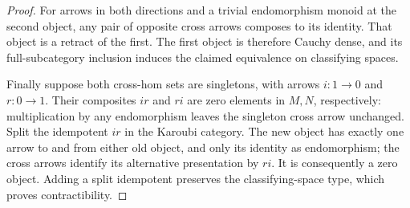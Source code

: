 \begin{proof}
For arrows in both directions and a trivial endomorphism monoid at
the second object, any pair of opposite cross arrows composes to its
identity. That object is a retract of the first. The first object is
therefore Cauchy dense, and its full-subcategory inclusion induces the
claimed equivalence on classifying spaces.

Finally suppose both cross-hom sets are singletons, with arrows
$i:1\to0$ and $r:0\to1$. Their composites $ir$ and $ri$ are zero
elements in $M,N$, respectively: multiplication by any endomorphism
leaves the singleton cross arrow unchanged. Split the idempotent $ir$
in the Karoubi category. The new object has exactly one arrow to and
from either old object, and only its identity as endomorphism; the
cross arrows identify its alternative presentation by $ri$.
It is consequently a zero object. Adding a split idempotent preserves
the classifying-space type, which proves contractibility.
\end{proof}

